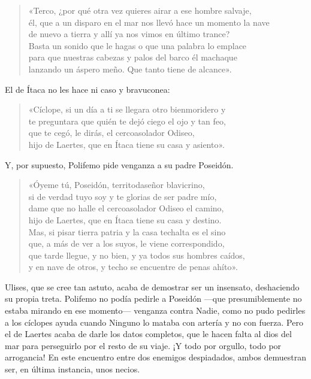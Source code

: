 \documentclass[11pt,a4paper]{article}
\begin{document}
\begin{verse}
«Terco, ¿por qué otra vez quieres airar a ese hombre salvaje,\\
él, que a un disparo en el mar nos llevó hace un momento la nave\\
de nuevo a tierra y allí ya nos vimos en último trance?\\
Basta un sonido que le hagas o que una palabra lo emplace\\
para que nuestras cabezas y palos del barco él machaque\\
lanzando un áspero meño. Que tanto tiene de alcance».
\end{verse}

El de Ítaca no les hace ni caso y bravuconea:

\begin{verse}
«Cíclope, si un día a ti se llegara otro bienmoridero y\\
te preguntara que quién te dejó ciego el ojo y tan feo,\\
que te cegó, le dirás, el cercoasolador Odiseo,\\
hijo de Laertes, que en Ítaca tiene su casa y asiento».
\end{verse}

Y, por supuesto, Polifemo pide venganza a su padre Poseidón.

\begin{verse}
«Óyeme tú, Poseidón, territodaseñor blavicrino,\\
si de verdad tuyo soy y te glorias de ser padre mío,\\
dame que no halle el cercoasolador Odiseo el camino,\\
hijo de Laertes, que en Ítaca tiene su casa y destino.\\
Mas, si pisar tierra patria y la casa techalta es el sino\\
que, a más de ver a los suyos, le viene correspondido,\\
que tarde llegue, y no bien, y ya todos sus hombres caídos,\\
y en nave de otros, y techo se encuentre de penas ahíto».
\end{verse}

Ulises, que se cree tan astuto, acaba de demostrar ser un insensato, deshaciendo su propia treta. Polifemo no podía pedirle a Poseidón ---que presumiblemente no estaba mirando en ese momento--- venganza contra Nadie, como no pudo pedirles a los cíclopes ayuda cuando Ninguno lo mataba con artería y no con fuerza. Pero el de Laertes acaba de darle los datos completos, que le hacen falta al dios del mar para perseguirlo por el resto de su viaje. ¡Y todo por orgullo, todo por arrogancia! En este encuentro entre dos enemigos despiadados, ambos demuestran ser, en última instancia, unos necios.
\end{document}
